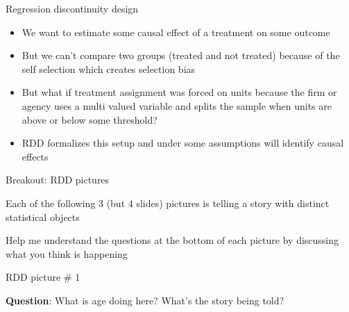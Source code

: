 \documentclass{beamer}
\begin{document}
	



\begin{frame}{Regression discontinuity design}

	\begin{itemize}	
	\item We want to estimate some causal effect of a treatment on some outcome
	\item But we can't compare two groups (treated and not treated) because of the self selection which creates selection bias
	\item But what if treatment assignment was forced on units because the firm or agency uses a multi valued variable and splits the sample when units are above or below some threshold?
	\item RDD formalizes this setup and under some assumptions will identify causal effects
	\end{itemize}
\end{frame}

\begin{frame}{Breakout: RDD pictures}

 Each of the following 3 (but 4 slides) pictures is telling a story with distinct statistical objects

\bigskip

Help me understand the questions at the bottom of each picture by discussing what you think is happening


\end{frame}




\begin{frame}{RDD picture \# 1}
	
	\begin{figure}
	\end{figure}

\textbf{Question}: What is age doing here? What's the story being told?

\end{frame}
\end{document}

